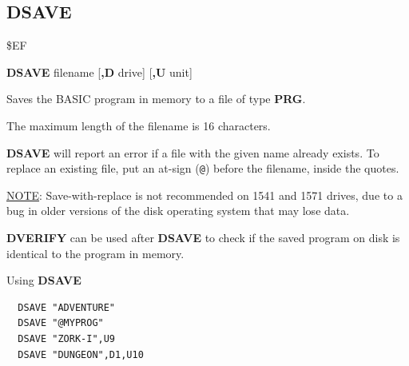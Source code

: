 \subsection{DSAVE}
\begin{description}[leftmargin=2cm,style=nextline]
\item [Token:] \$EF
\item [Format:] {\bf DSAVE} filename [{\bf,D} drive] [{\bf,U} unit]
\item [Usage:]
   Saves the BASIC program in memory to
   a file of type {\bf PRG}.

   \filenamedefinition

   The maximum length of the filename is 16 characters.

   {\bf DSAVE} will report an error if a file with the given name already exists. To replace an existing file, put an at-sign (\texttt{@}) before the filename, inside the quotes.

   \underline{NOTE}: Save-with-replace is not recommended on 1541 and 1571 drives, due to a bug in older versions of the disk operating system that may lose data.

   \drivedefinition

   \unitdefinition

\item [Remarks:]
   {\bf DVERIFY} can be used after {\bf DSAVE} to check
   if the saved program on disk is identical to the program
   in memory.

\item [Example:] Using {\bf DSAVE}
\begin{tcolorbox}[colback=black,coltext=white]
\verbatimfont{\codefont}
\begin{verbatim}
  DSAVE "ADVENTURE"
  DSAVE "@MYPROG"
  DSAVE "ZORK-I",U9
  DSAVE "DUNGEON",D1,U10
\end{verbatim}
\end{tcolorbox}
\end{description}


\newpage
